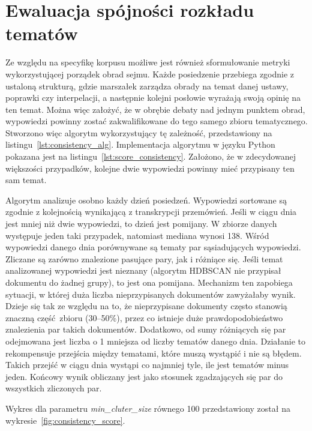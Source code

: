 \section{Ewaluacja spójności rozkładu tematów}\label{sec:consistency_scores}
	Ze względu na specyfikę korpusu możliwe jest również sformułowanie metryki wykorzystującej porządek obrad sejmu.
	Każde posiedzenie przebiega zgodnie z ustaloną strukturą, gdzie marszałek zarządza obrady na temat danej ustawy, poprawki czy interpelacji,
		a następnie kolejni posłowie wyrażają swoją opinię na ten temat.
	Można więc założyć, że w obrębie debaty nad jednym punktem obrad, wypowiedzi powinny zostać zakwalifikowane do tego samego zbioru tematycznego.
	Stworzono więc algorytm wykorzystujący tę zależność, przedstawiony na listingu~\ref{lst:consistency_alg}.
	Implementacja algorytmu w języku Python pokazana jest na listingu~\ref{lst:score_consistency}.
	Założono, że w zdecydowanej większości przypadków, kolejne dwie wypowiedzi powinny mieć przypisany ten sam temat.

	Algorytm analizuje osobno każdy dzień posiedzeń.
	Wypowiedzi sortowane są zgodnie z kolejnością wynikającą z transkrypcji przemówień.
	Jeśli w ciągu dnia jest mniej niż dwie wypowiedzi, to dzień jest pomijany.
	W zbiorze danych występuje jeden taki przypadek, natomiast mediana wynosi 138.
	Wśród wypowiedzi danego dnia porównywane są tematy par sąsiadujących wypowiedzi.
	Zliczane są zarówno znalezione pasujące pary, jak i różniące się.
	Jeśli temat analizowanej wypowiedzi jest nieznany (algorytm HDBSCAN nie przypisał dokumentu do żadnej grupy),
		to jest ona pomijana.
	Mechanizm ten zapobiega sytuacji, w której duża liczba nieprzypisanych dokumentów zawyżałaby wynik.
	Dzieje się tak ze względu na to, że nieprzypisane dokumenty często stanowią znaczną część zbioru (30--50\%),
		przez co istnieje duże prawdopodobieństwo znalezienia par takich dokumentów.
	Dodatkowo, od sumy różniących się par odejmowana jest liczba o 1 mniejsza od liczby tematów danego dnia.
	Działanie to rekompensuje przejścia między tematami, które muszą wystąpić i nie są błędem.
	Takich przejść w ciągu dnia wystąpi co najmniej tyle, ile jest tematów minus jeden.
	Końcowy wynik obliczany jest jako stosunek zgadzających się par do wszystkich zliczonych par.

	Wykres dla parametru \emph{min\_cluter\_size} równego 100 przedstawiony został na wykresie~\ref{fig:consistency_score}.
	
